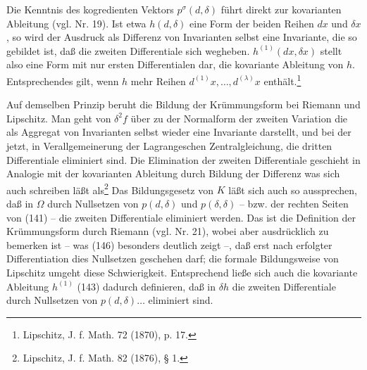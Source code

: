 Die Kenntnis des kogredienten Vektors $p^\sigma(d,\delta)$ führt direkt zur kovarianten Ableitung (vgl. Nr. 19). Ist etwa $h(d,\delta)$ eine Form der beiden Reihen $dx$ und $\delta x$, so wird der Ausdruck
als Differenz von Invarianten selbst eine Invariante, die so gebildet ist, daß die zweiten Differentiale sich wegheben. $h^{(1)}(dx,\delta x)$ stellt also eine Form mit nur ersten Differentialen dar, die kovariante Ableitung von $h$. Entsprechendes gilt, wenn $h$ mehr Reihen $d^{(1)}x,\ldots,d^{(\lambda)}x$ enthält.\footnote{Lipschitz, J. f. Math. 72 (1870), p. 17.}

Auf demselben Prinzip beruht die Bildung der Krümmungsform bei Riemann und Lipschitz. Man geht von $\delta^2 f$ über zu der \glqq{}Normalform der zweiten Variation\grqq{}
die als Aggregat von Invarianten selbst wieder eine Invariante darstellt, und bei der jetzt, in Verallgemeinerung der Lagrangeschen Zentralgleichung, die dritten Differentiale eliminiert sind. Die Elimination der zweiten Differentiale geschieht in Analogie mit der kovarianten Ableitung durch Bildung der Differenz
was sich auch schreiben läßt als\footnote{Lipschitz, J. f. Math. 82 (1876), § 1.}
Das Bildungsgesetz von $K$ läßt sich auch so aussprechen, daß in $\Omega$ durch Nullsetzen von $p(d,\delta)$ und $p(\delta,\delta)$ -- bzw. der rechten Seiten von (141) -- die zweiten Differentiale eliminiert werden. Das ist die Definition der Krümmungsform durch Riemann (vgl. Nr. 21), wobei aber ausdrücklich zu bemerken ist -- was (146) besonders deutlich zeigt --, daß erst nach erfolgter Differentiation dies Nullsetzen geschehen darf; die formale Bildungsweise von Lipschitz umgeht diese Schwierigkeit. Entsprechend ließe sich auch die kovariante Ableitung $h^{(1)}$ (143) dadurch definieren, daß in $\delta h$ die zweiten Differentiale durch Nullsetzen von $p(d,\delta)\ldots$ eliminiert sind.

